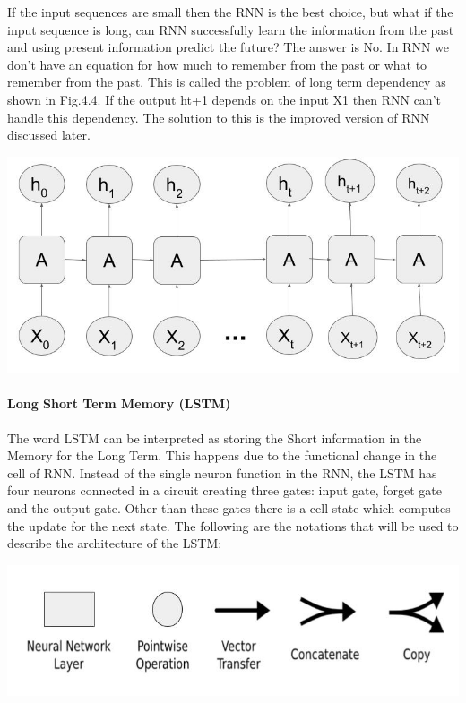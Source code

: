 If the input sequences are small then the RNN is the best choice, but what if the input sequence is long, can RNN successfully learn the information from the past and using present information predict the future? The answer is No. In RNN we don’t have an equation for how much to remember from the past or what to remember from the past. This is called the problem of long term dependency as shown in Fig.4.4. If the output ht+1 depends on the input X1 then RNN can’t handle this dependency. The solution to this is the improved version of RNN discussed later.

				\begin{center}
				\includegraphics[width=\linewidth]{figures/Problem-of-Long-Term-Dependency.jpg}	
				\label{fig: Long term dependency problem}
				\end{center}



\paragraph{Long Short Term Memory (LSTM)}

The word LSTM can be interpreted as storing the Short information in the Memory for the Long Term. This happens due to the functional change in the cell of RNN. Instead of the single neuron function in the RNN, the LSTM has four neurons connected in a circuit creating three gates: input gate, forget gate and the output gate. Other than these gates there is a cell state which computes the update for the next state. The following are the notations that will be used to describe the architecture of the LSTM:

				\begin{center}
				\includegraphics[width=\linewidth]{figures/Notations.jpg}	
				\label{fig: Notations}
				\end{center}

